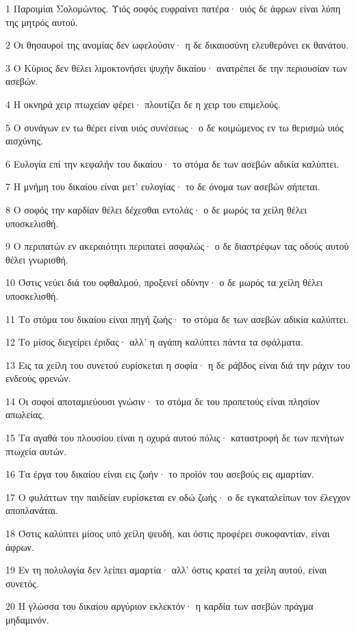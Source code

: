 \par 1 Παροιμίαι Σολομώντος. Υιός σοφός ευφραίνει πατέρα· υιός δε άφρων είναι λύπη της μητρός αυτού.
\par 2 Οι θησαυροί της ανομίας δεν ωφελούσιν· η δε δικαιοσύνη ελευθερόνει εκ θανάτου.
\par 3 Ο Κύριος δεν θέλει λιμοκτονήσει ψυχήν δικαίου· ανατρέπει δε την περιουσίαν των ασεβών.
\par 4 Η οκνηρά χειρ πτωχείαν φέρει· πλουτίζει δε η χειρ του επιμελούς.
\par 5 Ο συνάγων εν τω θέρει είναι υιός συνέσεως· ο δε κοιμώμενος εν τω θερισμώ υιός αισχύνης.
\par 6 Ευλογία επί την κεφαλήν του δικαίου· το στόμα δε των ασεβών αδικία καλύπτει.
\par 7 Η μνήμη του δικαίου είναι μετ' ευλογίας· το δε όνομα των ασεβών σήπεται.
\par 8 Ο σοφός την καρδίαν θέλει δέχεσθαι εντολάς· ο δε μωρός τα χείλη θέλει υποσκελισθή.
\par 9 Ο περιπατών εν ακεραιότητι περιπατεί ασφαλώς· ο δε διαστρέφων τας οδούς αυτού θέλει γνωρισθή.
\par 10 Όστις νεύει διά του οφθαλμού, προξενεί οδύνην· ο δε μωρός τα χείλη θέλει υποσκελισθή.
\par 11 Το στόμα του δικαίου είναι πηγή ζωής· το στόμα δε των ασεβών αδικία καλύπτει.
\par 12 Το μίσος διεγείρει έριδας· αλλ' η αγάπη καλύπτει πάντα τα σφάλματα.
\par 13 Εις τα χείλη του συνετού ευρίσκεται η σοφία· η δε ράβδος είναι διά την ράχιν του ενδεούς φρενών.
\par 14 Οι σοφοί αποταμιεύουσι γνώσιν· το στόμα δε του προπετούς είναι πλησίον απωλείας.
\par 15 Τα αγαθά του πλουσίου είναι η οχυρά αυτού πόλις· καταστροφή δε των πενήτων πτωχεία αυτών.
\par 16 Τα έργα του δικαίου είναι εις ζωήν· το προϊόν του ασεβούς εις αμαρτίαν.
\par 17 Ο φυλάττων την παιδείαν ευρίσκεται εν οδώ ζωής· ο δε εγκαταλείπων τον έλεγχον αποπλανάται.
\par 18 Όστις καλύπτει μίσος υπό χείλη ψευδή, και όστις προφέρει συκοφαντίαν, είναι άφρων.
\par 19 Εν τη πολυλογία δεν λείπει αμαρτία· αλλ' όστις κρατεί τα χείλη αυτού, είναι συνετός.
\par 20 Η γλώσσα του δικαίου αργύριον εκλεκτόν· η καρδία των ασεβών πράγμα μηδαμινόν.
